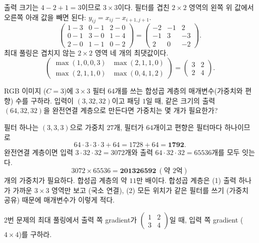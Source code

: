 \documentclass[11pt,a4paper]{article}
\begin{document}
\begin{problems}
\begin{sol}
출력 크기는 $4-2+1=3$이므로 $3\times3$이다.
필터를 겹친 $2\times2$ 영역의 왼쪽 위 값에서 오른쪽 아래 값을 빼면 된다: $y_{ij}=x_{ij}-x_{i+1,j+1}$.
\[
\begin{pmatrix}1-3&0-1&2-0\\0-1&3-0&1-4\\2-0&1-1&0-2\end{pmatrix}
=\boxed{\begin{pmatrix}-2&-1&2\\-1&3&-3\\2&0&-2\end{pmatrix}}.
\]
최대 풀링은 겹치지 않는 $2\times2$ 영역 네 개의 최댓값이다.
\[
\begin{pmatrix}\max(1,0,0,3)&\max(2,1,1,0)\\\max(2,1,1,0)&\max(0,4,1,2)\end{pmatrix}
=\boxed{\begin{pmatrix}3&2\\2&4\end{pmatrix}}.
\]
\end{sol}

\item RGB 이미지 ($C=3$)에 $3\times3$ 필터 $64$개를 쓰는 합성곱 계층의 매개변수(가중치와 편향) 수를 구하라.
입력이 $(3,32,32)$이고 패딩 $1$일 때, 같은 크기의 출력 $(64,32,32)$을 완전연결 계층으로 만든다면 가중치는 몇 개가 필요한가?

\begin{sol}
필터 하나는 $(3,3,3)$으로 가중치 $27$개, 필터가 $64$개이고 편향은 필터마다 하나이므로
\[
64\cdot3\cdot3\cdot3+64=1728+64=\mathbf{1792}.
\]
완전연결 계층이면 입력 $3\cdot32\cdot32=3072$개와 출력 $64\cdot32\cdot32=65536$개를 모두 잇는다.
\[
3072\times65536=\mathbf{201326592}\ (\text{약 }2\text{억})
\]
개의 가중치가 필요하다. 합성곱 계층의 약 $11$만 배이다.
합성곱 계층은 (1) 출력 하나가 가까운 $3\times3$ 영역만 보고 (국소 연결), (2) 모든 위치가 같은 필터를 쓰기 (가중치 공유) 때문에 매개변수가 이렇게 적다.
\end{sol}

\item 2번 문제의 최대 풀링에서 출력 쪽 gradient가 $\begin{pmatrix}1&2\\3&4\end{pmatrix}$일 때,
입력 쪽 gradient ($4\times4$)를 구하라.


\end{problems}
\end{document}

